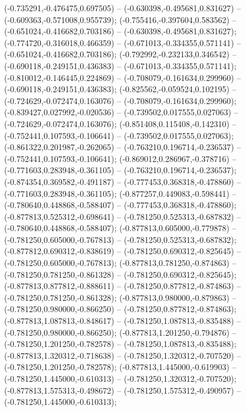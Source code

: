  (-0.735291,-0.476475,0.697505) -- (-0.630398,-0.495681,0.831627) -- (-0.609363,-0.571008,0.955739);
 (-0.755416,-0.397604,0.583562) -- (-0.651024,-0.416682,0.703186) -- (-0.630398,-0.495681,0.831627);
 (-0.774720,-0.316018,0.466359) -- (-0.671013,-0.334355,0.571141) -- (-0.651024,-0.416682,0.703186);
 (-0.792992,-0.232133,0.346542) -- (-0.690118,-0.249151,0.436383) -- (-0.671013,-0.334355,0.571141);
 (-0.810012,-0.146445,0.224869) -- (-0.708079,-0.161634,0.299960) -- (-0.690118,-0.249151,0.436383);
 (-0.825562,-0.059524,0.102195) -- (-0.724629,-0.072474,0.163076) -- (-0.708079,-0.161634,0.299960);
 (-0.839427,0.027992,-0.020536) -- (-0.739502,0.017555,0.027063) -- (-0.724629,-0.072474,0.163076);
 (-0.851408,0.115408,-0.142310) -- (-0.752441,0.107593,-0.106641) -- (-0.739502,0.017555,0.027063);
 (-0.861322,0.201987,-0.262065) -- (-0.763210,0.196714,-0.236537) -- (-0.752441,0.107593,-0.106641);
 (-0.869012,0.286967,-0.378716) -- (-0.771603,0.283948,-0.361105) -- (-0.763210,0.196714,-0.236537);
 (-0.874354,0.369582,-0.491187) -- (-0.777453,0.368318,-0.478860) -- (-0.771603,0.283948,-0.361105);
 (-0.877257,0.449083,-0.598441) -- (-0.780640,0.448868,-0.588407) -- (-0.777453,0.368318,-0.478860);
 (-0.877813,0.525312,-0.698641) -- (-0.781250,0.525313,-0.687832) -- (-0.780640,0.448868,-0.588407);
 (-0.877813,0.605000,-0.779878) -- (-0.781250,0.605000,-0.767813) -- (-0.781250,0.525313,-0.687832);
 (-0.877812,0.690312,-0.838619) -- (-0.781250,0.690312,-0.825645) -- (-0.781250,0.605000,-0.767813);
 (-0.877813,0.781250,-0.874863) -- (-0.781250,0.781250,-0.861328) -- (-0.781250,0.690312,-0.825645);
 (-0.877813,0.877812,-0.888611) -- (-0.781250,0.877812,-0.874863) -- (-0.781250,0.781250,-0.861328);
 (-0.877813,0.980000,-0.879863) -- (-0.781250,0.980000,-0.866250) -- (-0.781250,0.877812,-0.874863);
 (-0.877813,1.087813,-0.848617) -- (-0.781250,1.087813,-0.835488) -- (-0.781250,0.980000,-0.866250);
 (-0.877813,1.201250,-0.794876) -- (-0.781250,1.201250,-0.782578) -- (-0.781250,1.087813,-0.835488);
 (-0.877813,1.320312,-0.718638) -- (-0.781250,1.320312,-0.707520) -- (-0.781250,1.201250,-0.782578);
 (-0.877813,1.445000,-0.619903) -- (-0.781250,1.445000,-0.610313) -- (-0.781250,1.320312,-0.707520);
 (-0.877813,1.575313,-0.498672) -- (-0.781250,1.575312,-0.490957) -- (-0.781250,1.445000,-0.610313);
